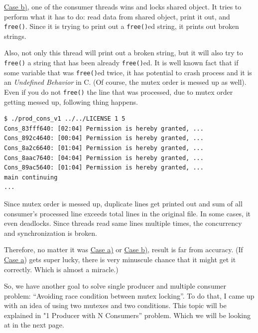 \documentclass{homework}
\begin{document}
\underline{Case b)}, one of the consumer threads wins and locks shared object. It tries to perform what it has to do: read data from shared object, print it out, and \texttt{free()}. Since it is trying to print out a \texttt{free()}ed string, it prints out broken strings.
\par
Also, not only this thread will print out a broken string, but it will also try to 
\texttt{free()} a string that has been already \texttt{free()}ed. It is well known fact that if some variable that was \texttt{free()}ed twice, it has potential to crash process and it is an \textit{Undefined Behavior} in C. (Of course, the mutex order is messed up as well). Even if you do not \texttt{free()} the line that was processed, due to mutex order getting messed up, following thing happens.
\pagebreak
\\
\begin{center}
\begin{code}
\begin{verbatim}
$ ./prod_cons_v1 ../../LICENSE 1 5
Cons_83fff640: [02:04] Permission is hereby granted, ...
Cons_892c4640: [00:04] Permission is hereby granted, ...
Cons_8a2c6640: [01:04] Permission is hereby granted, ...
Cons_8aac7640: [04:04] Permission is hereby granted, ...
Cons_89ac5640: [01:04] Permission is hereby granted, ...
main continuing
...
\end{verbatim}
\end{code}
\end{center}

Since mutex order is messed up, duplicate lines get printed out and sum of all consumer’s processed line exceeds total lines in the original file. In some cases, it even deadlocks. Since threads read same lines multiple times, the concurrency and synchronization is broken.
\par

Therefore, no matter it was \underline{Case a)} or \underline{Case b)}, result is far from accuracy. (If \underline{Case a}) gets super lucky, there is very minuscule chance that it might get it correctly. Which is almost a miracle.)
\par

So, we have another goal to solve single producer and multiple consumer problem: “Avoiding race condition between mutex locking”. To do that, I came up with an idea of using two mutexes and two conditions. This topic will be explained in "1 Producer with N Consumers” problem. Which we will be looking at in the next page.
\end{document}
